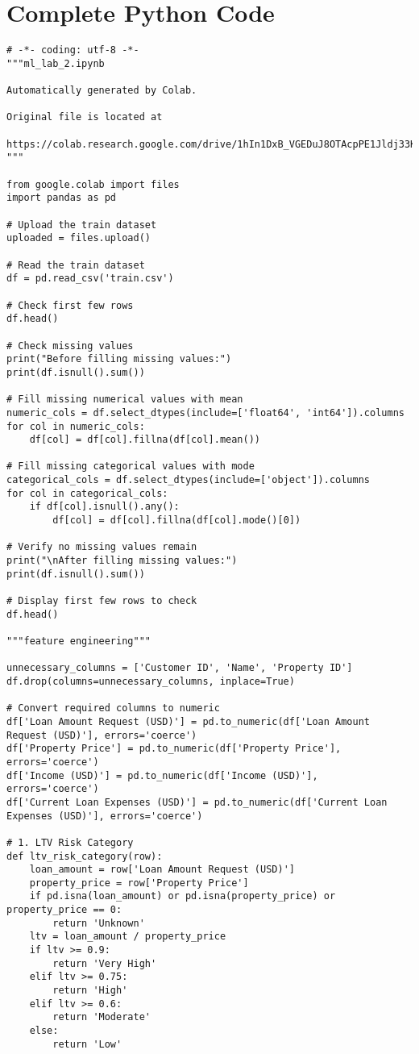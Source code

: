 \documentclass[11pt]{article}
\begin{document}
\section*{Complete Python Code}

\begin{lstlisting}[style=python]
# -*- coding: utf-8 -*-
"""ml_lab_2.ipynb

Automatically generated by Colab.

Original file is located at
    https://colab.research.google.com/drive/1hIn1DxB_VGEDuJ8OTAcpPE1Jldj33K9I
"""

from google.colab import files
import pandas as pd

# Upload the train dataset
uploaded = files.upload()

# Read the train dataset
df = pd.read_csv('train.csv')

# Check first few rows
df.head()

# Check missing values
print("Before filling missing values:")
print(df.isnull().sum())

# Fill missing numerical values with mean
numeric_cols = df.select_dtypes(include=['float64', 'int64']).columns
for col in numeric_cols:
    df[col] = df[col].fillna(df[col].mean())

# Fill missing categorical values with mode
categorical_cols = df.select_dtypes(include=['object']).columns
for col in categorical_cols:
    if df[col].isnull().any():
        df[col] = df[col].fillna(df[col].mode()[0])

# Verify no missing values remain
print("\nAfter filling missing values:")
print(df.isnull().sum())

# Display first few rows to check
df.head()

"""feature engineering"""

unnecessary_columns = ['Customer ID', 'Name', 'Property ID']
df.drop(columns=unnecessary_columns, inplace=True)

# Convert required columns to numeric
df['Loan Amount Request (USD)'] = pd.to_numeric(df['Loan Amount Request (USD)'], errors='coerce')
df['Property Price'] = pd.to_numeric(df['Property Price'], errors='coerce')
df['Income (USD)'] = pd.to_numeric(df['Income (USD)'], errors='coerce')
df['Current Loan Expenses (USD)'] = pd.to_numeric(df['Current Loan Expenses (USD)'], errors='coerce')

# 1. LTV Risk Category
def ltv_risk_category(row):
    loan_amount = row['Loan Amount Request (USD)']
    property_price = row['Property Price']
    if pd.isna(loan_amount) or pd.isna(property_price) or property_price == 0:
        return 'Unknown'
    ltv = loan_amount / property_price
    if ltv >= 0.9:
        return 'Very High'
    elif ltv >= 0.75:
        return 'High'
    elif ltv >= 0.6:
        return 'Moderate'
    else:
        return 'Low'


\end{lstlisting}
\end{document}
